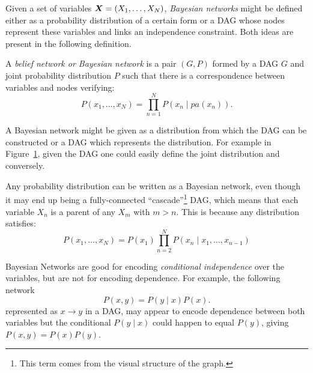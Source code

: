 
Given a set of variables \(\bm{X} = (X_{1},\dots,X_{N})\), \emph{Bayesian networks} might be defined either as a probability distribution of a certain form or a DAG whose nodes represent these variables and links an independence constraint. Both ideas are present in the following definition.

\begin{definition}
  A \emph{belief network or Bayesian network} is a pair \((G,P)\) formed by a DAG \(G\) and  joint probability distribution \(P\) such that there is a correspondence between variables and nodes verifying:
  \[
    P(x_{1},\dots,x_{N}) = \prod_{n=1}^{N}P(x_{n}\mid pa(x_{n})).
  \]
\end{definition}

\begin{remark}
  A Bayesian network might be given as a distribution from which the DAG can be constructed or a DAG which represents the distribution. For example in Figure~\ref{fig:bn_example}, given the DAG one could easily define the joint distribution and conversely.
\end{remark}

\begin{figure}[h!]
  \centering
    \label{fig:bn_example}
\end{figure}

Any probability distribution can be written as a Bayesian network, even though
it may end up being a fully-connected ``cascade''\footnote{This term comes from the visual structure of the graph.} DAG, which means that each variable \( X_n \) is a parent of any \( X_m \) with \( m > n \). This is because any distribution satisfies:
\[
   P(x_1, \dots, x_{N}) = P(x_1) \prod_{n=2}^{N}P(x_{n} \mid x_{1},\dots, x_{n-1})
 \]

Bayesian Networks are good for encoding \emph{conditional independence} over the
variables, but are not for encoding dependence. For example, the following
network
\[
P(x,y) = P(y\mid x)P(x).
\]
represented as \(x \to y\) in a DAG, may appear to encode dependence between both variables but the conditional \(P(y\mid x)\) could happen to equal \(P(y)\), giving \(P(x,y) = P(x)P(y)\).

